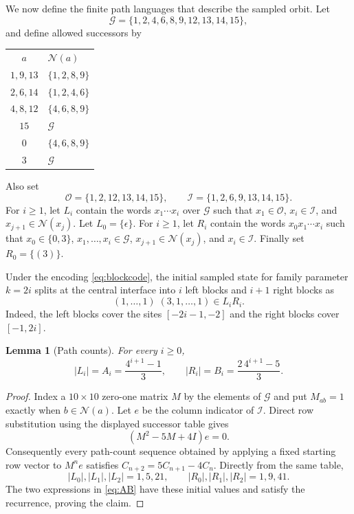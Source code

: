 \documentclass[11pt]{article}
\newtheorem{lemma}[theorem]{Lemma}
\theoremstyle{remark}
\newcommand{\InnerSet}{\mathcal I}
\newcommand{\OuterSet}{\mathcal O}
\newcommand{\GenericSet}{\mathcal G}
\newcommand{\NextSet}{\mathcal N}
\begin{document}
We now define the finite path languages that describe the sampled orbit.  Let
\[
 \GenericSet=\{1,2,4,6,8,9,12,13,14,15\},
\]
and define allowed successors by
\begin{center}
\begin{tabular}{c@{\qquad}l}
$a$ & $\NextSet(a)$\\
$1,9,13$ & $\{1,2,8,9\}$\\
$2,6,14$ & $\{1,2,4,6\}$\\
$4,8,12$ & $\{4,6,8,9\}$\\
$15$ & $\GenericSet$\\
$0$ & $\{4,6,8,9\}$\\
$3$ & $\GenericSet$\\
\end{tabular}
\end{center}
Also set
\[
 \OuterSet=\{1,2,12,13,14,15\},\qquad
 \InnerSet=\{1,2,6,9,13,14,15\}.
\]
For $i\geq1$, let $L_i$ contain the words $x_1\cdots x_i$ over $\GenericSet$
such that $x_1\in\OuterSet$, $x_i\in\InnerSet$, and
$x_{j+1}\in\NextSet(x_j)$.  Let $L_0=\{\epsilon\}$.
For $i\geq1$, let $R_i$ contain the words $x_0x_1\cdots x_i$ such that
$x_0\in\{0,3\}$, $x_1,\ldots,x_i\in\GenericSet$,
$x_{j+1}\in\NextSet(x_j)$, and $x_i\in\InnerSet$.  Finally set
$R_0=\{(3)\}$.

Under the encoding \eqref{eq:blockcode}, the initial sampled state for family
parameter $k=2i$ splits at the central interface into $i$ left blocks and
$i+1$ right blocks as
\begin{equation}\label{eq:initial-factors}
 (1,\ldots,1)\;(3,1,\ldots,1)
 \in L_iR_i.
\end{equation}
Indeed, the left blocks cover the sites $[-2i-1,-2]$ and the right blocks
cover $[-1,2i]$.

\begin{lemma}[Path counts]\label{lem:counts}
For every $i\geq0$,
\begin{equation}\label{eq:AB}
 |L_i|=A_i=\frac{4^{i+1}-1}{3},\qquad
 |R_i|=B_i=\frac{2\,4^{i+1}-5}{3}.
\end{equation}
\end{lemma}

\begin{proof}
Index a $10\times10$ zero-one matrix $M$ by the elements of $\GenericSet$ and
put $M_{ab}=1$ exactly when $b\in\NextSet(a)$.  Let $e$ be the column
indicator of $\InnerSet$.  Direct row substitution using the displayed successor
table gives
\begin{equation}\label{eq:minpoly}
 (M^2-5M+4I)e=0.
\end{equation}
Consequently every path-count sequence obtained by applying a fixed starting
row vector to $M^ne$ satisfies
$C_{n+2}=5C_{n+1}-4C_n$.  Directly from the same table,
\[
 |L_0|,|L_1|,|L_2|=1,5,21,
 \qquad
 |R_0|,|R_1|,|R_2|=1,9,41.
\]
The two expressions in \eqref{eq:AB} have these initial values and satisfy the
recurrence, proving the claim.
\end{proof}
\end{document}
